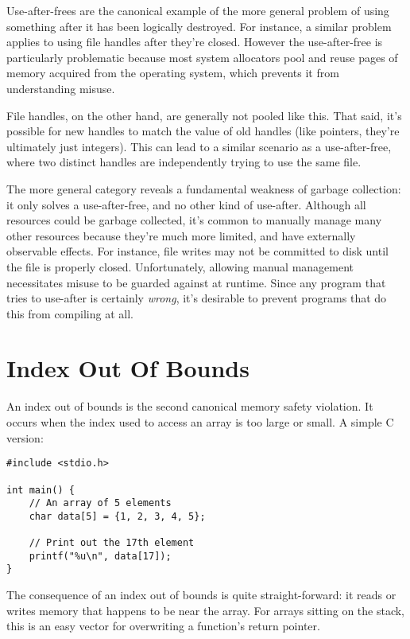 Use-after-frees are the canonical example of the more general problem of
using something after it has been logically destroyed. For instance, a similar
problem applies to using file handles after they're closed. However the
use-after-free is particularly problematic because most system allocators
pool and reuse pages of memory acquired from the operating system, which prevents
it from understanding misuse.

File handles, on the other hand, are generally not pooled like this. That said,
it's possible for new handles to match the value of old handles
(like pointers, they're ultimately just integers). This can lead to a similar
scenario as a use-after-free, where two distinct handles are independently
trying to use the same file.

The more general category reveals a fundamental weakness of garbage collection:
it only solves a use-after-free, and no other kind of use-after. Although all
resources could be garbage collected, it's common to manually manage many other
resources because they're much more limited, and have externally observable
effects. For instance, file writes may not be committed to disk until the file
is properly closed. Unfortunately, allowing manual management necessitates
misuse to be guarded against at runtime. Since any program that tries to use-after
is certainly \emph{wrong}, it's desirable to prevent programs that do this from
compiling at all.




\section{Index Out Of Bounds}

An index out of bounds is the second canonical memory safety violation. It
occurs when the index used to access an array is too large or small. A simple
C version:

\begin{verbatim}
#include <stdio.h>

int main() {
    // An array of 5 elements
    char data[5] = {1, 2, 3, 4, 5};

    // Print out the 17th element
    printf("%u\n", data[17]);
}
\end{verbatim}

The consequence of an index out of bounds is quite straight-forward: it reads
or writes memory that happens to be near the array. For arrays sitting on the
stack, this is an easy vector for overwriting a function's return pointer.

